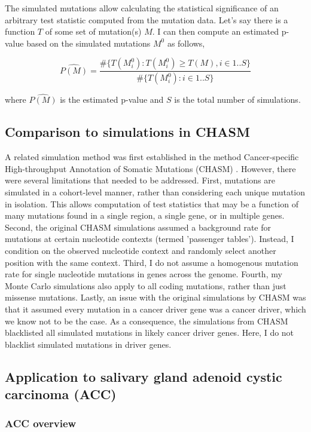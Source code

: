 The simulated mutations allow calculating the statistical significance of an arbitrary test statistic computed from the mutation data. Let's say there is a function $T$ of some set of mutation(s) $M$. I can then compute an estimated p-value based on the simulated mutations $M^0$ as follows,

\begin{equation}
\widehat{P(M)} = \frac{\#\{T(M^0_i) : T(M^0_i) \geq T(M), i \in 1..S\}}{\#\{T(M^0_i) : i \in 1..S\}}
\end{equation}

where $\widehat{P(M)}$ is the estimated p-value and $S$ is the total number of simulations. 

\subsection{Comparison to simulations in CHASM}

A related simulation method was first established in the method Cancer-specific High-throughput Annotation of Somatic Mutations (CHASM) \cite{RN29}. However, there were several limitations that needed to be addressed. First, mutations are simulated in a cohort-level manner, rather than considering each unique mutation in isolation. This allows computation of test statistics that may be a function of many mutations found in a single region, a single gene, or in multiple genes. Second, the original CHASM simulations assumed a background rate for mutations at certain nucleotide contexts (termed 'passenger tables'). Instead, I condition on the observed nucleotide context and randomly select another position with the same context. Third, I do not assume a homogenous mutation rate for single nucleotide mutations in genes across the genome. Fourth, my Monte Carlo simulations also apply to all coding mutations, rather than just missense mutations. Lastly, an issue with the original simulations by CHASM was that it assumed every mutation in a cancer driver gene was a cancer driver, which we know not to be the case. As a consequence, the simulations from CHASM blacklisted all simulated mutations in likely cancer driver genes. Here, I do not blacklist simulated mutations in driver genes.

\subsection{Application to salivary gland adenoid cystic carcinoma (ACC)}

\subsubsection{ACC overview}

